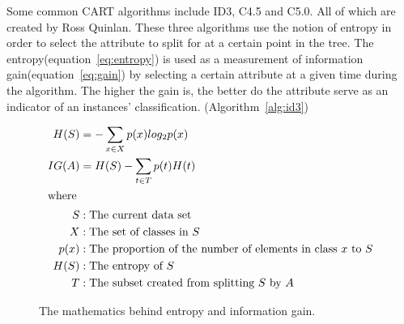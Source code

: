 	\bigskip\noindent
	Some common CART algorithms include ID3, C4.5 and C5.0. 
	All of which are created by Ross Quinlan\cite{quinlan:id3, quinlan:c45}.
	These three algorithms use the notion of entropy in order to select the attribute to split for at a certain point in the tree. 
	The entropy(equation~\ref{eq:entropy}) is used as a measurement of information gain(equation~\ref{eq:gain}) by selecting a certain attribute at a given time during the algorithm. 
	The higher the gain is, the better do the attribute serve as an indicator of an instances' classification. (Algorithm~\ref{alg:id3})
	\begin{figure}[H]
		\begin{align}
			H(S) &= -\sum_{x \in X}p(x)log_2p(x)\label{eq:entropy}\\
			IG(A) &= H(S) - \sum_{t \in T}p(t)H(t)\label{eq:gain}\\
			\intertext{where}
			S &: \text{The current data set}\nonumber\\
			X &: \text{The set of classes in $S$}\nonumber\\
			p(x) &: \text{The proportion of the number of elements in class $x$ to $S$}\nonumber\\
			H(S) &: \text{The entropy of $S$}\nonumber\\
			T &:	 \text{The subset created from splitting $S$ by $A$}\nonumber
		\end{align}
		\caption{The mathematics behind entropy and information gain.}
	\end{figure}
